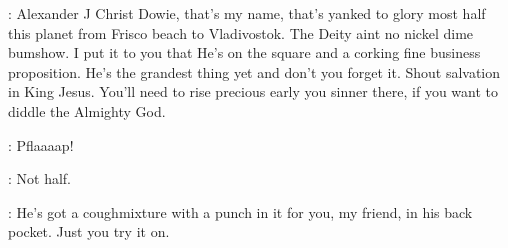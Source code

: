 \dowie:
Alexander J Christ Dowie,
that's my name,
that's
yanked to glory most half this planet from Frisco beach to Vladivostok.
The Deity aint no nickel dime bumshow.
I put it to you that He's on the
square and a corking fine business proposition.
He's the grandest thing
yet and don't you forget it.
Shout salvation in King Jesus.
You'll need
to rise precious early you sinner there,
if you want to diddle the
Almighty God.

:
Pflaaaap!

\stephen:
Not half.

\dowie:
He's got a coughmixture with a punch in it for you,
my friend,
in his back pocket.
Just you try it on.


